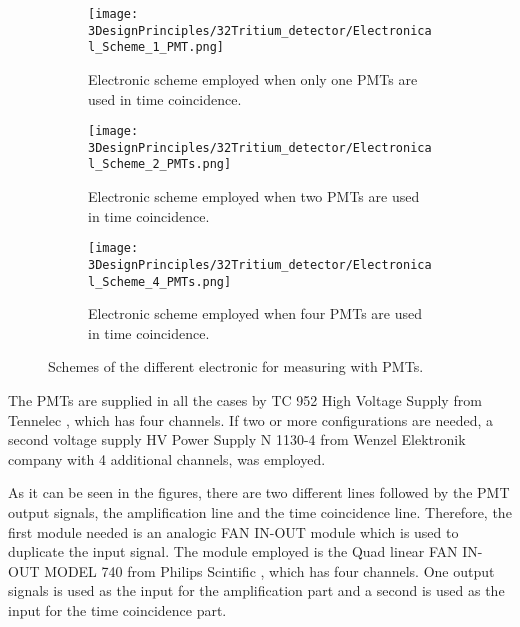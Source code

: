 \begin{figure}
\centering
    \begin{subfigure}[b]{1.0\textwidth}
    \centering
    \texttt{[image: 3DesignPrinciples/32Tritium\_detector/Electronical\_Scheme\_1\_PMT.png]}  
    \caption{Electronic scheme employed when only one PMTs are used in time coincidence.\label{subfig:ElectronicConfiguraiton1PMT}}
    \end{subfigure}
    \hfill
    \begin{subfigure}[b]{1.0\textwidth}
    \centering
    \texttt{[image: 3DesignPrinciples/32Tritium\_detector/Electronical\_Scheme\_2\_PMTs.png]}  
    \caption{Electronic scheme employed when two PMTs are used in time coincidence.\label{subfig:ElectronicConfiguraiton2PMT}}
    \end{subfigure}
    \hfill
    \begin{subfigure}[b]{1.0\textwidth}
    \centering
    \texttt{[image: 3DesignPrinciples/32Tritium\_detector/Electronical\_Scheme\_4\_PMTs.png]}  
    \caption{Electronic scheme employed when four PMTs are used in time coincidence.\label{subfig:ElectronicConfiguraiton4PMT}}
    \end{subfigure}
 \caption{Schemes of the different electronic for measuring with PMTs.}
 \label{fig:ElectronicConfiguraitonsPMT}
\end{figure}

The PMTs are supplied in all the cases by TC 952 High Voltage Supply from Tennelec \cite{DataSheetHVSupplyTennelec}, which has four channels. If two or more configurations are needed, a second voltage supply HV Power Supply N 1130-4 from Wenzel Elektronik company \cite{DataSheetHVSupplyWenzel} with 4 additional channels, was employed. 

As it can be seen in the figures, there are two different lines followed by the PMT output signals, the amplification line and the time coincidence line. Therefore, the first module needed is an analogic FAN IN-OUT module which is used to duplicate the input signal. The module employed is the Quad linear FAN IN-OUT MODEL 740 from Philips Scintific \cite{DataSheetFANINOUT}, which has four channels. One output signals is used as the input for the amplification part and a second is used as the input for the time coincidence part.

